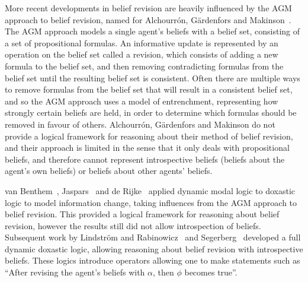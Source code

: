 More recent developments in belief revision are heavily influenced by the AGM
approach to belief revision, named for Alchourr{\'o}n, G{\"a}rdenfors
and Makinson~\cite{alchourron:1985}. The AGM approach models a single agent's
beliefs with a belief set, consisting of a set of propositional formulas. An
informative update is represented by an operation on the belief set called a
revision, which consists of adding a new formula to the belief set, and then
removing contradicting formulas from the belief set until the resulting belief
set is consistent. Often there are multiple ways to remove formulas from the
belief set that will result in a consistent belief set, and so the AGM approach
uses a model of entrenchment, representing how strongly certain beliefs are
held, in order to determine which formulas should be removed in favour of
others. Alchourr{\'o}n, G{\"a}rdenfors and Makinson do not provide a logical
framework for reasoning about their method of belief revision, and their
approach is limited in the sense that it only deals with propositional beliefs,
and therefore cannot represent introspective beliefs (beliefs about the agent's
own beliefs) or beliefs about other agents' beliefs. 

van Benthem~\cite{vanbenthem:1989, vanbenthem:1994, vanbenthem:1996},
Jaspars~\cite{jaspars:1994} and de Rijke~\cite{derijke:1994} applied dynamic modal
logic to doxastic logic to model information change, taking influences from the
AGM approach to belief revision. This provided a logical framework for reasoning
about belief revision, however the results still did not allow introspection of
beliefs.  Subsequent work by Lindstr{\"o}m and Rabinowicz~\cite{lindstrom:1999a,
lindstrom:1999b} and Segerberg~\cite{segerberg:1999a, segerberg:1999b} developed a
full dynamic doxastic logic, allowing reasoning about belief revision with
introspective beliefs. These logics introduce operators allowing one to make
statements such as ``After revising the agent's beliefs with $\alpha$, then
$\phi$ becomes true''.


